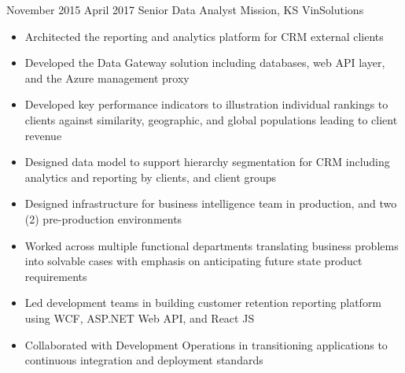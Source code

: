 \Experience
{November 2015}
{April 2017}
{Senior Data Analyst}
{Mission, KS}
{VinSolutions}
{
    \begin{itemize}
        \item Architected the reporting and analytics platform for CRM external
        clients
        \item Developed the Data Gateway solution including databases, web API
        layer, and the Azure management proxy
        \item Developed key performance indicators to illustration individual
        rankings to clients against similarity, geographic, and global
        populations leading to client revenue
        \item Designed data model to support hierarchy segmentation for CRM
        including analytics and reporting by clients, and client groups
        \item Designed infrastructure for business intelligence team in
        production, and two (2) pre-production environments
        \item Worked across multiple functional departments translating business
        problems into solvable cases with emphasis on anticipating future state
        product requirements
        \item Led development teams in building customer retention reporting
        platform using WCF, ASP.NET Web API, and React JS
        \item Collaborated with Development Operations in transitioning
        applications to continuous integration and deployment standards
    \end{itemize}
}